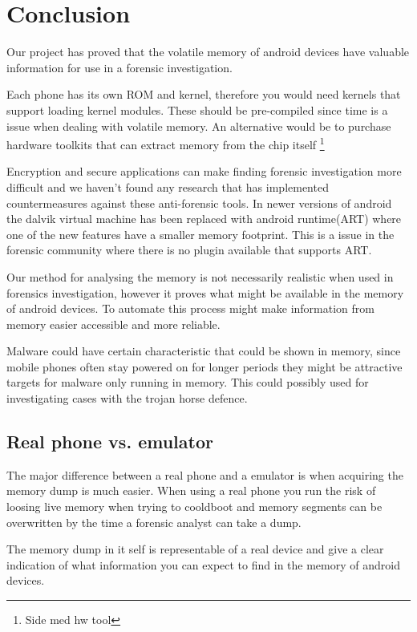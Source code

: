 \section{Conclusion}
Our project has proved that the volatile memory of android devices have valuable information for use 
in a forensic investigation.

Each phone has its own ROM and kernel, therefore you would need kernels that support loading kernel 
modules. These should be pre-compiled since time is a issue when dealing with volatile memory. An 
alternative would be to purchase hardware toolkits that can extract memory from the chip itself 
\footnote{Side med hw tool} %

Encryption and secure applications can make finding forensic investigation more difficult and we haven't found 
any research that has implemented countermeasures against these anti-forensic tools. In newer versions 
of android the dalvik virtual machine has been replaced with android runtime(ART) where one of the new 
features have a smaller memory footprint. This is a issue in the forensic community where there is no 
plugin available that supports ART.

Our method for analysing the memory is not necessarily realistic when used in forensics investigation, 
however it proves what might be available in the memory of android devices. 
To automate this process might make information from memory easier accessible and more reliable.

Malware could have certain characteristic that could be shown in memory, since mobile phones often stay 
powered on for longer periods they might be attractive targets for malware only running in memory. 
This could possibly used for investigating cases with the trojan horse defence.

\subsection{Real phone vs. emulator}
The major difference between a real phone and a emulator is when acquiring the memory dump is much 
easier. When using a real phone you run the risk of loosing live memory when trying to cooldboot and 
memory segments can be overwritten by the time a forensic analyst can take a dump.

The memory dump in it self is representable of a real device and give a clear indication of what 
information you can expect to find in the memory of android devices.




